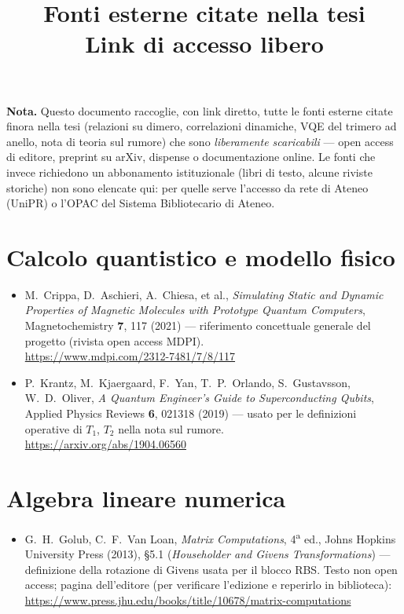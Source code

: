 \documentclass[11pt,a4paper]{article}
\title{Fonti esterne citate nella tesi\\
\large Link di accesso libero}
\author{}
\date{}
\begin{document}
\maketitle

\noindent\textbf{Nota.} Questo documento raccoglie, con link diretto, tutte le fonti esterne citate finora nella tesi (relazioni su dimero, correlazioni dinamiche, VQE del trimero ad anello, nota di teoria sul rumore) che sono \emph{liberamente scaricabili} — open access di editore, preprint su arXiv, dispense o documentazione online. Le fonti che invece richiedono un abbonamento istituzionale (libri di testo, alcune riviste storiche) non sono elencate qui: per quelle serve l'accesso da rete di Ateneo (UniPR) o l'OPAC del Sistema Bibliotecario di Ateneo.

\section{Calcolo quantistico e modello fisico}

\begin{itemize}[leftmargin=1.3em]
\item M.\ Crippa, D.\ Aschieri, A.\ Chiesa, et al., \emph{Simulating Static and Dynamic Properties of Magnetic Molecules with Prototype Quantum Computers}, Magnetochemistry \textbf{7}, 117 (2021) — riferimento concettuale generale del progetto (rivista open access MDPI).\\
\url{https://www.mdpi.com/2312-7481/7/8/117}

\item P.\ Krantz, M.\ Kjaergaard, F.\ Yan, T.\ P.\ Orlando, S.\ Gustavsson, W.\ D.\ Oliver, \emph{A Quantum Engineer's Guide to Superconducting Qubits}, Applied Physics Reviews \textbf{6}, 021318 (2019) — usato per le definizioni operative di $T_1$, $T_2$ nella nota sul rumore.\\
\url{https://arxiv.org/abs/1904.06560}
\end{itemize}

\section{Algebra lineare numerica}

\begin{itemize}[leftmargin=1.3em]
\item G.\ H.\ Golub, C.\ F.\ Van Loan, \emph{Matrix Computations}, 4\textsuperscript{a} ed., Johns Hopkins University Press (2013), \S 5.1 (\emph{Householder and Givens Transformations}) — definizione della rotazione di Givens usata per il blocco RBS. Testo non open access; pagina dell'editore (per verificare l'edizione e reperirlo in biblioteca):\\
\url{https://www.press.jhu.edu/books/title/10678/matrix-computations}
\end{itemize}
\end{document}
